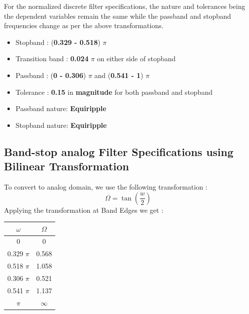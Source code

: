 \documentclass{article}
\begin{document}
\vspace{1em}
\noindent
For the normalized discrete filter specifications, the nature and tolerances being the dependent variables remain the same while the passband and stopband frequencies change as per the above transformations. 
\begin{itemize}
    \item Stopband : (\textbf{0.329 -  0.518}) {$\pi$}
    \item  Transition band : \textbf{0.024} $\pi$ on either side of stopband
    \item Passband : (\textbf{0 - 0.306}) {$\pi$} and (\textbf{0.541 - 1}) {$\pi$}
    \item  Tolerance : \textbf{0.15} in \textbf{magnitude} for both passband and stopband
    \item Passband nature: \textbf{Equiripple}
    \item Stopband nature: \textbf{Equiripple}
\end{itemize}

\subsection{Band-stop analog Filter Specifications using Bilinear
Transformation}
To convert to analog domain, we use the following transformation :
\begin{equation*}
    \Omega = \tan (\frac{w}{2})
\end{equation*}
Applying the transformation at Band Edges we get :
\begin{table}[H]
		\begin{center}
		\begin{tabular}{|c|c|}
			\hline
			$\omega$ & $\Omega$\\
			
			\hline
                0 & 0\\
                \hline
                0.329 $\pi$ & 0.568 \\
                \hline
                0.518 $\pi$ & 1.058\\
                \hline
                0.306 $\pi$ & 0.521\\
                \hline
                0.541 $\pi$ & 1.137\\
                \hline
                $\pi$ & $\infty$\\
                \hline
            
		\end{tabular}
		\end{center}
\end{table}
\end{document}
